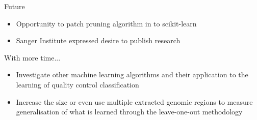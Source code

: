 \documentclass{beamer}
\begin{document}
\begin{frame}[t]
    \begin{beamerboxesrounded}[shadow=true]{}
        \begin{center}
            Future
        \end{center}
    \end{beamerboxesrounded}
    \begin{itemize}
        \item Opportunity to patch pruning algorithm in to scikit-learn
        \item Sanger Institute expressed desire to publish research
    \end{itemize}

    \vskip 0.5cm

    \begin{beamerboxesrounded}[shadow=true]{}
        \begin{center}
            With more time...
        \end{center}
    \end{beamerboxesrounded}
    \begin{itemize}
        \item Investigate other machine learning algorithms and their application
            to the learning of quality control classification
        \item Increase the size or even use multiple extracted genomic regions 
            to measure generalisation of what is learned through the leave-one-out
            methodology
    \end{itemize}
\end{frame}
\end{document}
